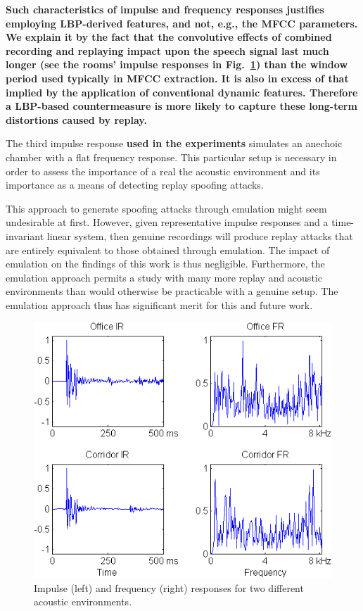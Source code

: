 {\bfseries Such characteristics of impulse and frequency responses justifies employing LBP-derived features, and not, e.g., the MFCC parameters. We explain it by the fact that the convolutive effects of combined recording and replaying impact upon the speech signal last much longer (see the rooms' impulse responses in Fig.~\ref{fig::Room_IRs}) than the window period used typically in MFCC extraction.  It is also in excess of that implied by the application of conventional dynamic features. Therefore a LBP-based countermeasure is more likely to capture these long-term distortions caused by replay.}

The third impulse response {\bfseries used in the experiments} simulates an anechoic chamber with a flat frequency response.  This particular setup is necessary in order to assess the importance of a real the acoustic environment and its importance as a means of detecting replay spoofing attacks.

This approach to generate spoofing attacks through emulation might seem undesirable at first.  However, given representative impulse responses and a time-invariant linear system, then genuine recordings will produce replay attacks that are entirely equivalent to those obtained through emulation.  The impact of emulation on the findings of this work is thus negligible.  Furthermore, the emulation approach permits a study with many more replay and acoustic environments than would otherwise be practicable with a genuine setup.  The emulation approach thus has significant merit for this and future work.


\begin{figure}
	\centering
	\includegraphics[width=1\linewidth]{Figs/Room_IRs.png}
	\caption{Impulse (left) and frequency (right) responses for two different acoustic environments.}
	\label{fig::Room_IRs}
\end{figure}



